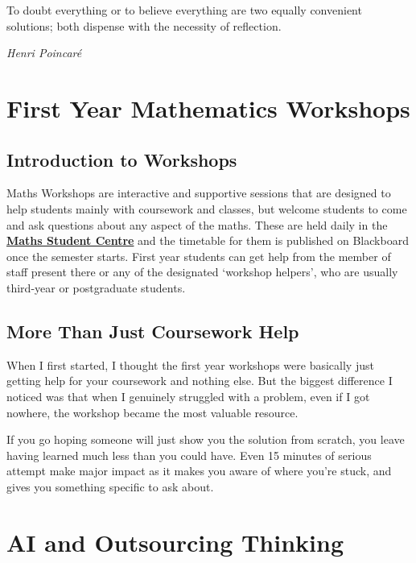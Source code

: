\epigraph{To doubt everything or to believe everything are two equally convenient solutions; both dispense with the necessity of reflection.}
{\textit{Henri Poincaré}}

\section{First Year Mathematics Workshops}

\subsection{Introduction to Workshops}

Maths Workshops are interactive and supportive sessions that are designed to help students mainly with coursework and classes, but  welcome students to come and ask questions about any aspect of the maths. These are held daily in the \textbf{\href{https://www.southampton.ac.uk/study/facilities/maths-study-social-spaces}{Maths Student Centre}} and the timetable for them is published on Blackboard once the semester starts. First year students can get help from the member of staff present there or any of the designated `workshop helpers', who are usually third-year or postgraduate students. 

\subsection{More Than Just Coursework Help}

When I first started, I thought the first year workshops were basically just getting help for your coursework and nothing else. But the biggest difference I noticed was that when I genuinely struggled with a problem, even if I got nowhere, the workshop became the most valuable resource. 

If you go hoping someone will just show you the solution from scratch, you leave having learned much less than you could have. Even 15 minutes of serious attempt make major impact as it makes you aware of where you're stuck, and gives you something specific to ask about. 


\section{AI and Outsourcing Thinking}

